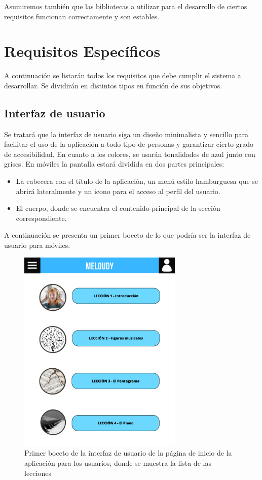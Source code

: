 Asumiremos también que las bibliotecas a utilizar para el desarrollo de ciertos requisitos funcionan correctamente y son estables.

\section{Requisitos Específicos}
A continuación se listarán todos los requisitos que debe cumplir el sistema a desarrollar. Se dividirán en distintos tipos en función de sus objetivos.

\subsection{Interfaz de usuario}
Se tratará que la interfaz de usuario siga un diseño minimalista y sencillo para facilitar el uso de la aplicación a todo tipo de personas y 
garantizar cierto grado de accesibilidad. En cuanto a los colores, se usarán tonalidades de azul junto con grises.
En móviles la pantalla estará dividida en dos partes principales: 
\begin{itemize}
    \item La cabecera con el título de la aplicación, un menú estilo hamburguesa que se abrirá lateralmente y un icono para el acceso al perfil del usuario.
    \item El cuerpo, donde se encuentra el contenido principal de la sección correspondiente.
\end{itemize}

    A continuación se presenta un primer boceto de lo que podría ser la interfaz de usuario para móviles.

\begin{figure}[H]

    \centering
    \includegraphics[width=0.7\textwidth]{imagenes/c3/boceto.png}
    \caption{Primer boceto de la interfaz de usuario de la página de inicio de la aplicación para los usuarios, donde se muestra la lista de las lecciones}
    \label{fig:artly}

\end{figure}

